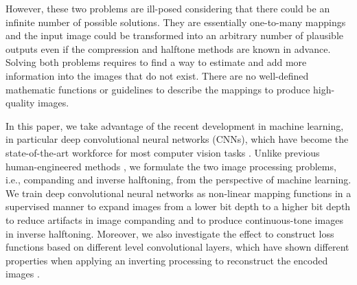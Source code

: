 \documentclass[journal]{IEEEtran}
\begin{document}
However, these two problems are ill-posed considering that there could be an infinite number of possible solutions. They are essentially one-to-many mappings and the input image could be transformed into an arbitrary number of plausible outputs even if the compression and halftone methods are known in advance. Solving both problems requires to find a way to estimate and add more information into the images that do not exist. There are no well-defined mathematic functions or guidelines to describe the mappings to produce high-quality images. 

In this paper, we take advantage of the recent development in machine learning, in particular deep convolutional neural networks (CNNs), which have become the state-of-the-art workforce for most computer vision tasks \cite{krizhevsky2012imagenet,simonyan2014very}. Unlike previous human-engineered methods \cite{li2005compressing,kite2000fast,shen2001robust,easley2009inverse}, we formulate the two image processing problems, i.e., companding and inverse halftoning, from the perspective of machine learning. We train deep convolutional neural networks as non-linear mapping functions in a supervised manner to expand images from a lower bit depth to a higher bit depth to reduce artifacts in image companding and to produce continuous-tone images in inverse halftoning. Moreover, we also investigate the effect to construct loss functions based on different level convolutional layers, which have shown different properties when applying an inverting processing to reconstruct the encoded images \cite{mahendran2015understanding}.
\end{document}
